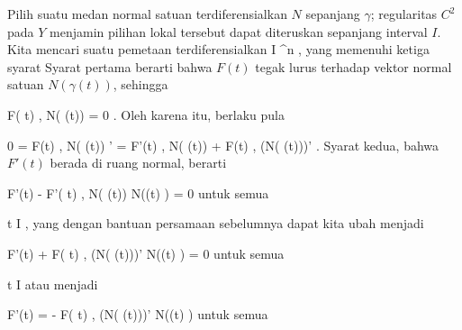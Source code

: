 {

Pilih suatu medan normal satuan terdiferensialkan $N$ sepanjang $\gamma$; regularitas $C^2$ pada $Y$ menjamin pilihan lokal tersebut dapat diteruskan sepanjang interval $I$. Kita mencari suatu pemetaan terdiferensialkan
 { I } { \R^n
} {,}
yang memenuhi ketiga syarat
Syarat pertama berarti bahwa $F(t)$ tegak lurus terhadap vektor normal satuan $N (\gamma(t))$, sehingga

\mavergleichskettedisp
{\vergleichskette
{ \left\langle F( t) ,  N( \gamma(t))   \right\rangle
}
{ =} { 0
}
{ } {
}
{ } {
}
{ } {
}
}
{}{}{.}
Oleh karena itu, berlaku pula

\mavergleichskettedisp
{\vergleichskette
{ 0
}
{ =} { \left\langle F(t)  ,  N( \gamma(t))   \right\rangle'
}
{ =} { \left\langle F'(t)  ,  N( \gamma(t))   \right\rangle +  \left\langle F(t)  ,  (N( \gamma(t)))'   \right\rangle
}
{ } {
}
{ } {
}
}
{}{}{.}
Syarat kedua, bahwa $F'(t)$ berada di ruang normal, berarti

\mavergleichskettedisp
{\vergleichskette
{ F'(t) - \left\langle F'( t) ,  N( \gamma(t))   \right\rangle N(\gamma(t) )
}
{ =} { 0
}
{ } {
}
{ } {
}
{ } {
}
}
{}{}{}
untuk semua

\mavergleichskette
{\vergleichskette
{ t
}
{ \in }{ I
}
{  }{
}
{    }{
}
{   }{
}
}
{}{}{,}
yang dengan bantuan persamaan sebelumnya dapat kita ubah menjadi

\mavergleichskettedisp
{\vergleichskette
{ F'(t) + \left\langle F( t) ,  (N( \gamma(t)))'   \right\rangle N(\gamma(t) )
}
{ =} { 0
}
{ } {
}
{ } {
}
{ } {
}
}
{}{}{}
untuk semua

\mavergleichskette
{\vergleichskette
{ t
}
{ \in }{ I
}
{  }{
}
{    }{
}
{   }{
}
}
{}{}{}
atau menjadi

\mavergleichskettedisp
{\vergleichskette
{ F'(t)
}
{ =} { - \left\langle F( t) ,  (N( \gamma(t)))'   \right\rangle N(\gamma(t) )
}
{ } {
}
{ } {
}
{ } {
}
}
{}{}{}
untuk semua

}
